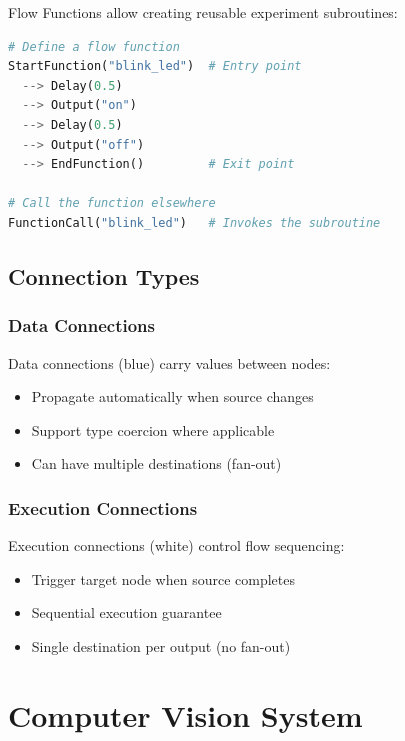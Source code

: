 \documentclass[11pt,a4paper]{article}
\begin{document}
Flow Functions allow creating reusable experiment subroutines:

\begin{lstlisting}[language=Python]
# Define a flow function
StartFunction("blink_led")  # Entry point
  --> Delay(0.5)
  --> Output("on")
  --> Delay(0.5)
  --> Output("off")
  --> EndFunction()         # Exit point

# Call the function elsewhere
FunctionCall("blink_led")   # Invokes the subroutine
\end{lstlisting}

\subsection{Connection Types}

\subsubsection{Data Connections}

Data connections (blue) carry values between nodes:
\begin{itemize}    \item Propagate automatically when source changes
    \item Support type coercion where applicable
    \item Can have multiple destinations (fan-out)
\end{itemize}

\subsubsection{Execution Connections}

Execution connections (white) control flow sequencing:
\begin{itemize}    \item Trigger target node when source completes
    \item Sequential execution guarantee
    \item Single destination per output (no fan-out)
\end{itemize}

\section{Computer Vision System}
\end{document}
